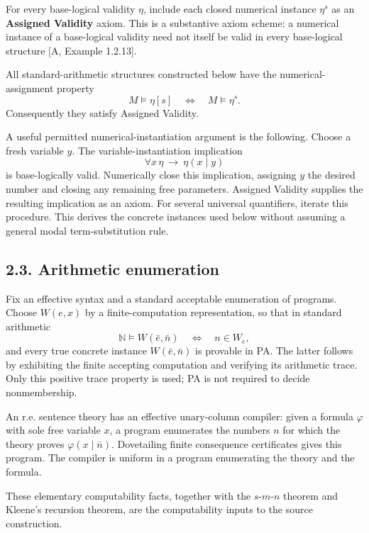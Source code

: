 \documentclass[
  11pt,
  letterpaper,
]{article}
\begin{document}
For every base-logical validity \(\eta\), include each closed numerical
instance \(\eta^s\) as an \textbf{Assigned Validity} axiom. This is a
substantive axiom scheme: a numerical instance of a base-logical
validity need not itself be valid in every base-logical structure {[}A,
Example 1.2.13{]}.

All standard-arithmetic structures constructed below have the
numerical-assignment property \[
M\models\eta[s]\quad\Longleftrightarrow\quad M\models\eta^s.
\tag{L3}
\] Consequently they satisfy Assigned Validity.

A useful permitted numerical-instantiation argument is the following.
Choose a fresh variable \(y\). The variable-instantiation implication \[
\forall x\,\eta\ \to\ \eta(x\mid y)
\] is base-logically valid. Numerically close this implication,
assigning \(y\) the desired number and closing any remaining free
parameters. Assigned Validity supplies the resulting implication as an
axiom. For several universal quantifiers, iterate this procedure. This
derives the concrete instances used below without assuming a general
modal term-substitution rule.

\subsection{2.3. Arithmetic enumeration}\label{arithmetic-enumeration}

Fix an effective syntax and a standard acceptable enumeration of
programs. Choose \(W(e,x)\) by a finite-computation representation, so
that in standard arithmetic \[
\mathbb N\models W(\bar e,\bar n)
\quad\Longleftrightarrow\quad n\in W_e,
\] and every true concrete instance \(W(\bar e,\bar n)\) is provable in
PA. The latter follows by exhibiting the finite accepting computation
and verifying its arithmetic trace. Only this positive trace property is
used; PA is not required to decide nonmembership.

An r.e. sentence theory has an effective unary-column compiler: given a
formula \(\varphi\) with sole free variable \(x\), a program enumerates
the numbers \(n\) for which the theory proves \(\varphi(x\mid\bar n)\).
Dovetailing finite consequence certificates gives this program. The
compiler is uniform in a program enumerating the theory and the formula.

These elementary computability facts, together with the
\(s\)-\(m\)-\(n\) theorem and Kleene's recursion theorem, are the
computability inputs to the source construction.
\end{document}
